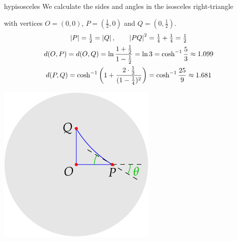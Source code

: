 \begin{example}{}{hypisosceles}
We calculate the sides and angles in the isosceles right-triangle\par
\begin{minipage}[t]{0.69\linewidth}\vspace{-8pt}
with vertices $O=(0,0)$, $P=(\frac 12,0)$ and $Q=(0,\frac 12)$.
\begin{gather*}
\left| P\right|=\tfrac 12=\left| Q\right|,\qquad \left| PQ\right|^2=\tfrac 14+\tfrac 14=\tfrac 12\\
d(O,P)=d(O,Q)=\ln\frac{1+\frac 12}{1-\frac 12}=\ln 3=\cosh^{-1}\frac 53\approx 1.099\\
d(P,Q)=\cosh^{-1}\left(1+\frac{2\cdot \frac 12}{(1-\frac 14)^2}\right) =\cosh^{-1}\frac{25}9 \approx 1.681
\end{gather*}
\end{minipage}\hfill
\begin{minipage}[t]{0.3\linewidth}\vspace{-20pt}
\flushright\includegraphics[scale=0.9]{models-dist4}
\end{minipage}
\goodbreak


\end{example}
